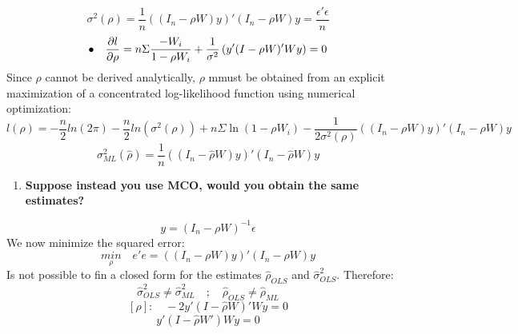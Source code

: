 \documentclass[12pt,onecolumn]{article}
\begin{document}
\begin{enumerate}
\begin{enumerate}
\begin{equation*}
        \end{equation*}
        \begin{equation*}
            \boxed{\sigma^2(\rho)=\frac{1}{n}\left((I_n-\rho{W})y\right)'(I_n-\rho{W})y}=\frac{\epsilon'\epsilon}{n}
        \end{equation*}
        \begin{equation*}
            \bullet \quad \pdv{l}{\rho}=n\Sigma\frac{-W_i}{1-\rho{W_i}}+\frac{1}{\sigma^2}\left(y'(I-\rho{W})'Wy\right)=0
        \end{equation*}
        Since $\rho$ cannot be derived analytically, $\rho$ mmust be obtained from an explicit maximization of a concentrated log-likelihood function using numerical optimization:
        \begin{equation*}
            l(\rho)=-{\frac{n}{2}}ln(2\pi)-{\frac{n}{2}}ln(\sigma^2(\rho))+n\Sigma\ln(1-\rho{W_i})-{\frac{1}{2\sigma^2(\rho)}}\left((I_n-\rho{W})y\right)'(I_n-\rho{W})y
        \end{equation*}
        \begin{equation*}
            \sigma^2_{ML}(\hat{\rho})=\frac{1}{n}\left((I_n-\hat{\rho}{W})y\right)'(I_n-\hat{\rho}{W})y
        \end{equation*}
        \begin{enumerate}[resume]
            \item \bf{Suppose instead you use MCO, would you obtain the same estimates?}
        \end{enumerate}
        \begin{equation*}
            y=(I_n-\rho{W})^{-1}\epsilon
        \end{equation*}
        We now minimize the squared error:
        \begin{equation*}
            \underset{\rho}{min} \quad e'e=\left((I_n-\rho{W})y\right)'(I_n-\rho{W})y
        \end{equation*}
        Is not possible to fin a closed form for the estimates $\hat{\rho}_{OLS}$ and $\hat{\sigma}^2_{OLS}$. Therefore:
        \begin{equation*}
            \hat{\sigma}^2_{OLS}\neq\hat{\sigma}^2_{ML} \quad ; \quad \hat{\rho}_{OLS}\neq\hat{\rho}_{ML}
        \end{equation*}
        \begin{equation*}
            \left[\rho\right]: \quad -2y'(I-\hat{\rho}W)'Wy=0
        \end{equation*}
        \begin{equation*}
            y'(I-\hat{\rho}W')Wy=0

\end{equation*}
\end{enumerate}
\end{enumerate}
\end{document}
